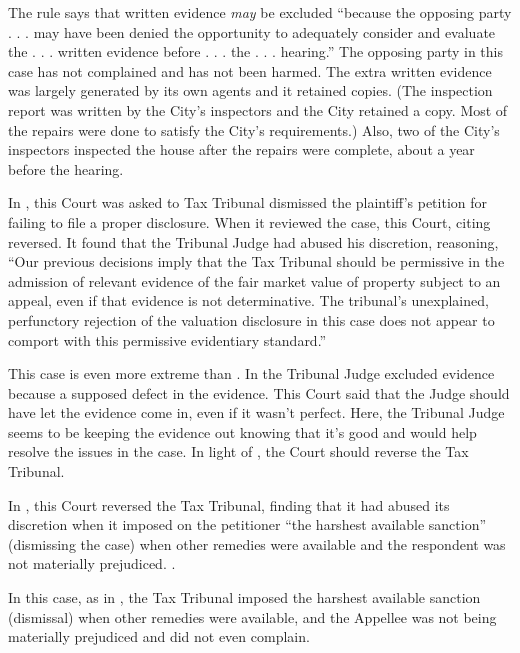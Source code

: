 \documentclass[12pt,\documentclassflag]{michiganCourtOfAppealsBrief}
\begin{document}
{The rule says that written evidence \emph{may} be excluded ``because the opposing party . . . may have been denied the opportunity to adequately consider and evaluate the . . . written evidence before . . . the . . .  hearing.'' The opposing party in this case has not complained and has not been harmed. The extra written evidence was largely generated by its own agents and it retained copies. (The inspection report was written by the City's inspectors and the City retained a copy. Most of the repairs were done to satisfy the City's requirements.) Also, two of the City's inspectors inspected the house after the repairs were complete, about a year before the hearing.

In \cite[s]{Professional Plaza}, this Court was asked to  Tax Tribunal dismissed the plaintiff's petition for failing to file a proper disclosure. When it reviewed the case, this Court, citing  reversed. It found that the Tribunal Judge had abused his discretion, reasoning, ``Our previous decisions imply that the Tax Tribunal should be permissive in the admission of relevant evidence of the fair market value of property subject to an appeal, even if that evidence is not determinative. The tribunal's unexplained, perfunctory rejection of the valuation disclosure in this case does not appear to comport with this permissive evidentiary standard.'' 

This case is even more extreme than \cite[s]{Professional Plaza}. In \cite[s]{Professional Plaza} the Tribunal Judge excluded evidence because a supposed defect in the evidence. This Court said that the Judge should have let the evidence come in, even if it wasn't perfect. Here, the Tribunal Judge seems to be keeping the evidence out knowing that it's good and would help resolve the issues in the case. In light of \cite[s]{Professional Plaza}, the Court should reverse the Tax Tribunal.

In \cite{Stevens}, this Court reversed the Tax Tribunal, finding that it had abused its discretion when it imposed on the petitioner ``the harshest available sanction'' (dismissing the case) when other remedies were available and the respondent was not materially prejudiced. .

In this case, as in \cite[s]{Stevens}, the Tax Tribunal imposed the harshest available sanction (dismissal) when other remedies were available, and the Appellee was not being materially prejudiced and did not even complain. 

}
\end{document}

